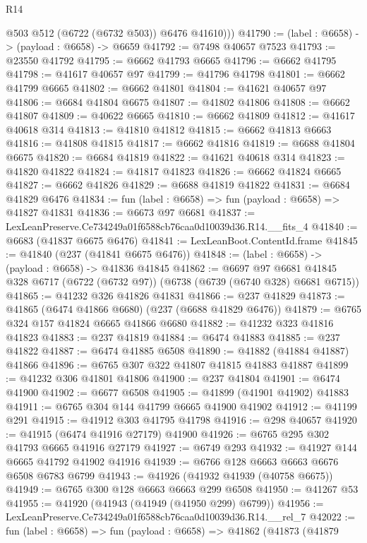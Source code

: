 \begin{lexlean}{R14}
\begin{coremodule}
          @503
          @512
          (@6722 (@6732 @503))
          @6476
          @41610)))
@41790 := (label : @6658) -> (payload : @6658) -> @6659
@41792 := @7498 @40657 @7523
@41793 := @23550 @41792
@41795 := @6662 @41793 @6665
@41796 := @6662 @41795
@41798 := @41617 @40657 @97
@41799 := @41796 @41798
@41801 := @6662 @41799 @6665
@41802 := @6662 @41801
@41804 := @41621 @40657 @97
@41806 := @6684 @41804 @6675
@41807 := @41802 @41806
@41808 := @6662 @41807
@41809 := @40622 @6665
@41810 := @6662 @41809
@41812 := @41617 @40618 @314
@41813 := @41810 @41812
@41815 := @6662 @41813 @6663
@41816 := @41808 @41815
@41817 := @6662 @41816
@41819 := @6688 @41804 @6675
@41820 := @6684 @41819
@41822 := @41621 @40618 @314
@41823 := @41820 @41822
@41824 := @41817 @41823
@41826 := @6662 @41824 @6665
@41827 := @6662 @41826
@41829 := @6688 @41819 @41822
@41831 := @6684 @41829 @6476
@41834 := fun (label : @6658) => fun (payload : @6658) => @41827 @41831
@41836 := @6673 @97 @6681
@41837 := LexLeanPreserve.Ce734249a01f6588cb76caa0d10039d36.R14.__fits_4
@41840 := @6683 (@41837 @6675 @6476)
@41841 := LexLeanBoot.ContentId.frame
@41845 := @41840 (@237 (@41841 @6675 @6476))
@41848 := (label : @6658) -> (payload : @6658) -> @41836 @41845
@41862 := @6697
    @97
    @6681
    @41845
    @328
    @6717
    (@6722 (@6732 @97))
    (@6738 (@6739 (@6740 @328) @6681 @6715))
@41865 := @41232 @326 @41826 @41831
@41866 := @237 @41829
@41873 := @41865 (@6474 @41866 @6680) (@237 (@6688 @41829 @6476))
@41879 := @6765 @324 @157 @41824 @6665 @41866 @6680
@41882 := @41232 @323 @41816 @41823
@41883 := @237 @41819
@41884 := @6474 @41883
@41885 := @237 @41822
@41887 := @6474 @41885 @6508
@41890 := @41882 (@41884 @41887) @41866
@41896 := @6765 @307 @322 @41807 @41815 @41883 @41887
@41899 := @41232 @306 @41801 @41806
@41900 := @237 @41804
@41901 := @6474 @41900
@41902 := @6677 @6508
@41905 := @41899 (@41901 @41902) @41883
@41911 := @6765 @304 @144 @41799 @6665 @41900 @41902
@41912 := @41199 @291
@41915 := @41912 @303 @41795 @41798
@41916 := @298 @40657
@41920 := @41915 (@6474 @41916 @27179) @41900
@41926 := @6765 @295 @302 @41793 @6665 @41916 @27179
@41927 := @6749 @293
@41932 := @41927 @144 @6665 @41792 @41902 @41916
@41939 := @6766 @128 @6663 @6663 @6676 @6508 @6783 @6799
@41943 := @41926 (@41932 @41939 (@40758 @6675))
@41949 := @6765 @300 @128 @6663 @6663 @299 @6508
@41950 := @41267 @53
@41955 := @41920 (@41943 (@41949 (@41950 @299) @6799))
@41956 := LexLeanPreserve.Ce734249a01f6588cb76caa0d10039d36.R14.__rel_7
@42022 := fun (label : @6658) =>
  fun (payload : @6658) =>
  @41862
    (@41873
      (@41879

\end{coremodule}
\end{lexlean}
